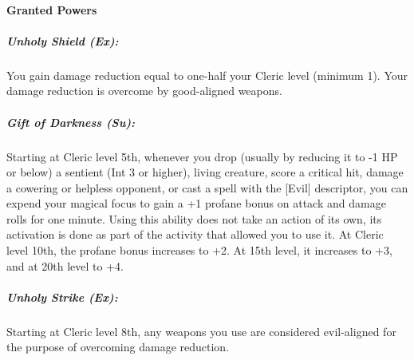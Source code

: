 \paragraph{Granted Powers}
\subparagraph{Unholy Shield (Ex):} 
You gain damage reduction equal to one-half your Cleric level (minimum 1).
Your damage reduction is overcome by good-aligned weapons.
\subparagraph{Gift of Darkness (Su):}
Starting at Cleric level 5th, whenever you drop (usually by reducing it to -1 HP or below) 
a sentient (Int 3 or higher), living creature, score a critical hit, damage a cowering or helpless opponent, 
or cast a spell with the [Evil] descriptor, you can expend your magical focus to gain a +1 profane bonus on attack and damage rolls for one minute.
Using this ability does not take an action of its own, its activation is done as part of the activity that allowed you to use it.
At Cleric level 10th, the profane bonus increases to +2. At 15th level, it increases to +3, and at 20th level to +4.
\subparagraph{Unholy Strike (Ex):}
Starting at Cleric level 8th, any weapons you use are considered evil-aligned for the purpose of overcoming damage reduction.

